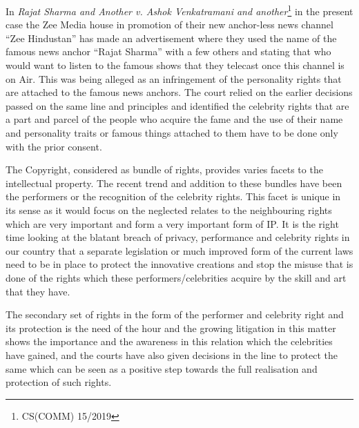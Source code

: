\begin{multicols}{2}
\noi
In \textit{Rajat Sharma and Another v. Ashok Venkatramani and another}\footnote{CS(COMM) 15/2019} in the present case the
Zee Media house in promotion of their new anchor-less news channel “Zee Hindustan” has
made an advertisement where they used the name of the famous news anchor “Rajat Sharma”
with a few others and stating that who would want to listen to the famous shows that they
telecast once this channel is on Air. This was being alleged as an infringement of the
personality rights that are attached to the famous news anchors. The court relied on the earlier
decisions passed on the same line and principles and identified the celebrity rights that are a
part and parcel of the people who acquire the fame and the use of their name and personality
traits or famous things attached to them have to be done only with the prior consent. 


\noi
The Copyright, considered as bundle of rights, provides varies facets to the intellectual
property. The recent trend and addition to these bundles have been the performers or the
recognition of the celebrity rights. This facet is unique in its sense as it would focus on the
neglected relates to the neighbouring rights which are very important and form a very
important form of IP. It is the right time looking at the blatant breach of privacy, performance
and celebrity rights in our country that a separate legislation or much improved form of the
current laws need to be in place to protect the innovative creations and stop the misuse that is
done of the rights which these performers/celebrities acquire by the skill and art that they
have.

\noi
The secondary set of rights in the form of the performer and celebrity right and its protection
is the need of the hour and the growing litigation in this matter shows the importance and the awareness in this relation which the celebrities have gained, and the courts have also given
decisions in the line to protect the same which can be seen as a positive step towards the full
realisation and protection of such rights.

\label{end2021-art9}
\end{multicols}
